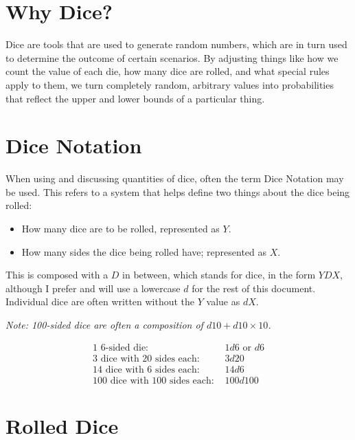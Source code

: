 \documentclass[../main.tex]{subfiles}
\begin{document}
    \section{Why Dice?}

    Dice are tools that are used to generate random numbers, which are in turn used to determine the outcome of certain scenarios. By adjusting things like how we count the value of each die, how many dice are rolled, and what special rules apply to them, we turn completely random, arbitrary values into probabilities that reflect the upper and lower bounds of a particular thing.

    \section{Dice Notation}

    When using and discussing quantities of dice, often the term Dice Notation may be used. This refers to a system that helps define two things about the dice being rolled:

    \begin{itemize}
        \item How many dice are to be rolled, represented as $Y$.
        \item How many sides the dice being rolled have; represented as $X$.
    \end{itemize}

    This is composed with a $D$ in between, which stands for dice, in the form $YDX$, although I prefer and will use a lowercase $d$ for the rest of this document. Individual dice are often written without the $Y$ value as $dX$. 
    
    \emph{Note: 100-sided dice are often a composition of $d10+d10\times10$.}
    \begin{mdframed}[style=Arrata]
        \begin{align*}
            \text{1 6-sided die: }                  & 1d6 \text{ or } d6    \\
            \text{3 dice with 20 sides each: }      & 3d20                  \\
            \text{14 dice with 6 sides each: }      & 14d6                  \\
            \text{100 dice with 100 sides each: }   & 100d100
        \end{align*}
    \end{mdframed}

    \section{Rolled Dice}
\end{document}
